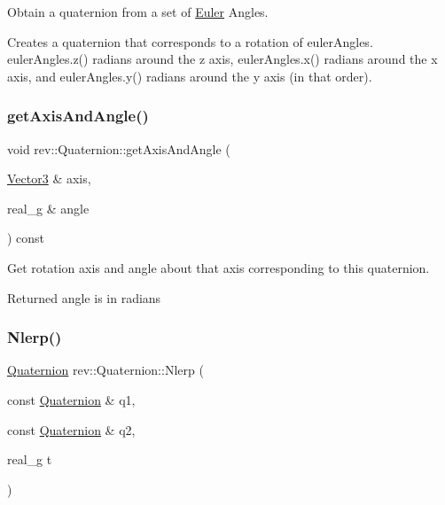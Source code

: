Obtain a quaternion from a set of \mbox{\hyperlink{class_euler}{Euler}} Angles. 

Creates a quaternion that corresponds to a rotation of euler\+Angles. euler\+Angles.\+z() radians around the z axis, euler\+Angles.\+x() radians around the x axis, and euler\+Angles.\+y() radians around the y axis (in that order). \mbox{\label{classrev_1_1_quaternion_a8c429750f9460c64f220ff6876beb818}} 
\subsubsection{\texorpdfstring{getAxisAndAngle()}{getAxisAndAngle()}}
{\footnotesize\ttfamily void rev\+::\+Quaternion\+::get\+Axis\+And\+Angle (\begin{DoxyParamCaption}\item[{\mbox{\hyperlink{classrev_1_1_vector}{Vector3}} \&}]{axis,  }\item[{real\+\_\+g \&}]{angle }\end{DoxyParamCaption}) const}



Get rotation axis and angle about that axis corresponding to this quaternion. 

Returned angle is in radians \mbox{\label{classrev_1_1_quaternion_a4373b7eea8d53d6e19b942e5c8a0b366}} 
\subsubsection{\texorpdfstring{Nlerp()}{Nlerp()}}
{\footnotesize\ttfamily \mbox{\hyperlink{classrev_1_1_quaternion}{Quaternion}} rev\+::\+Quaternion\+::\+Nlerp (\begin{DoxyParamCaption}\item[{const \mbox{\hyperlink{classrev_1_1_quaternion}{Quaternion}} \&}]{q1,  }\item[{const \mbox{\hyperlink{classrev_1_1_quaternion}{Quaternion}} \&}]{q2,  }\item[{real\+\_\+g}]{t }\end{DoxyParamCaption})\hspace{0.3cm}{\ttfamily [static]}}



